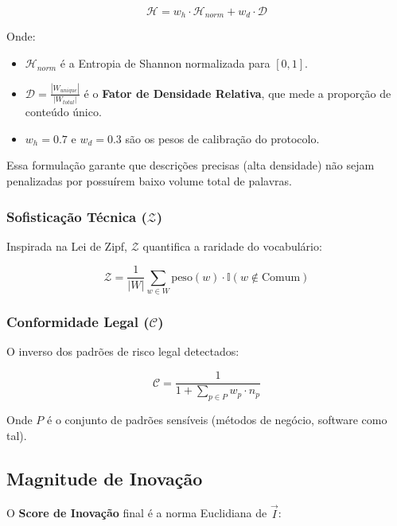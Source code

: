 \documentclass[12pt,a4paper]{article}
\begin{document}
\begin{equation}
\mathcal{H} = w_h \cdot \mathcal{H}_{norm} + w_d \cdot \mathcal{D}
\end{equation}

Onde:
\begin{itemize}
    \item $\mathcal{H}_{norm}$ é a Entropia de Shannon normalizada para $[0, 1]$.
    \item $\mathcal{D} = \frac{|W_{unique}|}{|W_{total}|}$ é o \textbf{Fator de Densidade Relativa}, que mede a proporção de conteúdo único.
    \item $w_h = 0.7$ e $w_d = 0.3$ são os pesos de calibração do protocolo.
\end{itemize}

Essa formulação garante que descrições precisas (alta densidade) não sejam penalizadas por possuírem baixo volume total de palavras.

\subsubsection{Sofisticação Técnica ($\mathcal{Z}$)}

Inspirada na Lei de Zipf, $\mathcal{Z}$ quantifica a raridade do vocabulário:

\begin{equation}
\mathcal{Z} = \frac{1}{|W|} \sum_{w \in W} \text{peso}(w) \cdot \mathbb{I}(w \notin \text{Comum})
\end{equation}

\subsubsection{Conformidade Legal ($\mathcal{C}$)}

O inverso dos padrões de risco legal detectados:

\begin{equation}
\mathcal{C} = \frac{1}{1 + \sum_{p \in P} w_p \cdot n_p}
\end{equation}

Onde $P$ é o conjunto de padrões sensíveis (métodos de negócio, software como tal).

\subsection{Magnitude de Inovação}

O \textbf{Score de Inovação} final é a norma Euclidiana de $\vec{I}$:
\end{document}
